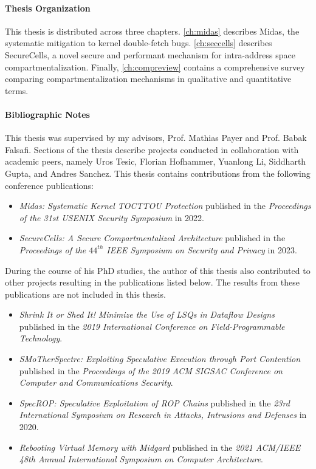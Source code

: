 \paragraph{Thesis Organization}
This thesis is distributed across three chapters. 
\autoref{ch:midas} describes Midas, the systematic mitigation to
kernel double-fetch bugs.
\autoref{ch:seccells} describes SecureCells, a novel secure and performant 
mechanism for intra-address space compartmentalization.
Finally, \autoref{ch:compreview} contains a comprehensive survey comparing
compartmentalization mechanisms in qualitative and quantitative terms.

\paragraph{Bibliographic Notes}
This thesis was supervised by my advisors, Prof. Mathias Payer and Prof. Babak Falsafi.
Sections of the thesis describe projects conducted in collaboration with academic peers, 
namely Uros Tesic, Florian Hofhammer, Yuanlong Li, Siddharth Gupta, and Andres Sanchez.
This thesis contains contributions from the following conference publications:
\begin{itemize}
      \item \emph{Midas: Systematic Kernel TOCTTOU Protection} published in
            the 
            \emph{Proceedings of the 31st USENIX Security Symposium} in 2022.
      \item \emph{SecureCells: A Secure Compartmentalized Architecture} published in
            the 
            \emph{Proceedings of the $44^{th}$ IEEE Symposium on Security and Privacy} 
            in 2023.
\end{itemize}

During the course of his PhD studies, the author of this thesis also contributed to
other projects resulting in the publications listed below.
The results from these publications are not included in this thesis.
\begin{itemize}
      \item \emph{Shrink It or Shed It! Minimize the Use of LSQs in Dataflow Designs}
            published in the
            \emph{2019 International Conference on Field-Programmable Technology}.
      \item \emph{SMoTherSpectre: Exploiting Speculative Execution through Port Contention}
            published in the
            \emph{Proceedings of the 2019 ACM SIGSAC Conference on Computer and Communications Security}.
      \item \emph{SpecROP: Speculative Exploitation of ROP Chains}
            published in the
            \emph{23rd International Symposium on Research in Attacks, Intrusions and Defenses}
            in 2020.
      \item \emph{Rebooting Virtual Memory with Midgard}
            published in the
            \emph{2021 ACM/IEEE 48th Annual International Symposium on Computer Architecture}.
\end{itemize}
